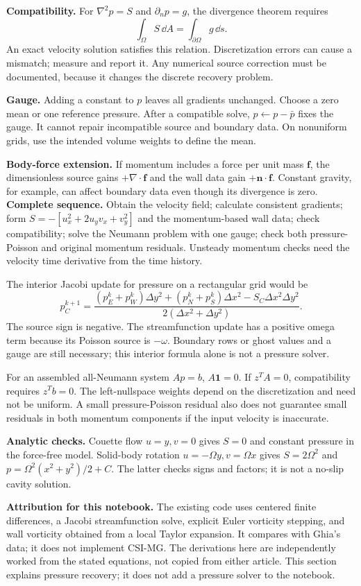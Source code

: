 \textbf{Compatibility.} For $\nabla^2p=S$ and $\partial_np=g$, the divergence theorem requires
\[
\boxed{\int_\Omega S\,\dd A=\int_{\partial\Omega}g\,\dd s.}
\]
An exact velocity solution satisfies this relation. Discretization errors can cause a mismatch; measure and report it. Any numerical source correction must be documented, because it changes the discrete recovery problem.

\textbf{Gauge.} Adding a constant to $p$ leaves all gradients unchanged. Choose a zero mean or one reference pressure. After a compatible solve, $p\leftarrow p-\bar p$ fixes the gauge. It cannot repair incompatible source and boundary data. On nonuniform grids, use the intended volume weights to define the mean.

\textbf{Body-force extension.} If momentum includes a force per unit mass $\boldsymbol f$, the dimensionless source gains $+\nabla\cdot\boldsymbol f$ and the wall data gain $+\boldsymbol n\cdot\boldsymbol f$. Constant gravity, for example, can affect boundary data even though its divergence is zero.
\newpage
{}\label{sec:pressure-references}
\textbf{Complete sequence.} Obtain the velocity field; calculate consistent gradients; form $S=-[u_x^2+2u_yv_x+v_y^2]$ and the momentum-based wall data; check compatibility; solve the Neumann problem with one gauge; check both pressure-Poisson and original momentum residuals. Unsteady momentum checks need the velocity time derivative from the time history.

The interior Jacobi update for pressure on a rectangular grid would be
\[
p_C^{k+1}=\frac{(p_E^k+p_W^k)\Delta y^2+(p_N^k+p_S^k)\Delta x^2-S_C\Delta x^2\Delta y^2}{2(\Delta x^2+\Delta y^2)}.
\]
The source sign is negative. The streamfunction update has a positive omega term because its Poisson source is $-\omega$. Boundary rows or ghost values and a gauge are still necessary; this interior formula alone is not a pressure solver.

For an assembled all-Neumann system $A p=b$, $A\boldsymbol1=0$. If $z^TA=0$, compatibility requires $z^Tb=0$. The left-nullspace weights depend on the discretization and need not be uniform. A small pressure-Poisson residual also does not guarantee small residuals in both momentum components if the input velocity is inaccurate.

\textbf{Analytic checks.} Couette flow $u=y,v=0$ gives $S=0$ and constant pressure in the force-free model. Solid-body rotation $u=-\Omega y,v=\Omega x$ gives $S=2\Omega^2$ and $p=\Omega^2(x^2+y^2)/2+C$. The latter checks signs and factors; it is not a no-slip cavity solution.

\textbf{Attribution for this notebook.} The existing code uses centered finite differences, a Jacobi streamfunction solve, explicit Euler vorticity stepping, and wall vorticity obtained from a local Taylor expansion. It compares with Ghia's data; it does not implement CSI-MG. The derivations here are independently worked from the stated equations, not copied from either article. This section explains pressure recovery; it does not add a pressure solver to the notebook.
